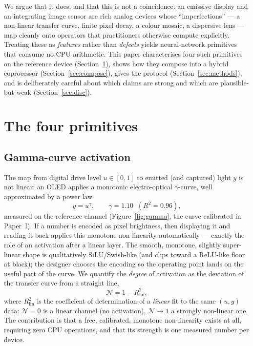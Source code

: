 \documentclass[11pt]{article}
\begin{document}
We argue that it does, and that this is not a coincidence: an emissive display and an
integrating image sensor are rich analog devices whose ``imperfections'' --- a non-linear
transfer curve, finite pixel decay, a colour mosaic, a dispersive lens --- map cleanly onto
operators that practitioners otherwise compute explicitly. Treating these as \emph{features}
rather than \emph{defects} yields neural-network primitives that consume no CPU arithmetic.
This paper characterises four such primitives on the reference device (Section~\ref{sec:prim}),
shows how they compose into a hybrid coprocessor (Section~\ref{sec:compose}), gives the
protocol (Section~\ref{sec:methods}), and is deliberately careful about which claims are strong
and which are plausible-but-weak (Section~\ref{sec:disc}).

\section{The four primitives}
\label{sec:prim}

\subsection{Gamma-curve activation}
The map from digital drive level $u\in[0,1]$ to emitted (and captured) light $y$ is not
linear: an OLED applies a monotonic electro-optical $\gamma$-curve, well approximated by a
power law
\begin{equation}
y = u^{\gamma}, \qquad \gamma = 1.10 \;\; (R^2 = 0.96),
\end{equation}
measured on the reference channel (Figure~\ref{fig:gamma}, the curve calibrated in Paper~I).
If a number is encoded as pixel brightness, then displaying it and reading it back applies this
monotone non-linearity automatically --- exactly the role of an activation after a linear
layer. The smooth, monotone, slightly super-linear shape is qualitatively SiLU/Swish-like (and
clips toward a ReLU-like floor at black); the designer chooses the encoding so the operating
point lands on the useful part of the curve. We quantify the \emph{degree} of activation as the
deviation of the transfer curve from a straight line,
\begin{equation}
\mathcal{N} = 1 - R^2_\text{lin},
\end{equation}
where $R^2_\text{lin}$ is the coefficient of determination of a \emph{linear} fit to the same
$(u,y)$ data: $\mathcal{N}=0$ is a linear channel (no activation), $\mathcal{N}\to 1$ a
strongly non-linear one. The contribution is that a free, calibrated, monotone non-linearity
exists at all, requiring zero CPU operations, and that its strength is one measured number per
device.
\end{document}
